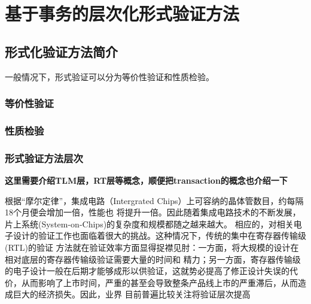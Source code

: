 
\graphicspath{{figures/}}

\chapter{基于事务的层次化形式验证方法}
\label{cha:hierarchy}


\section{形式化验证方法简介}
\label{sec:hierarchy-intro}

一般情况下，形式验证可以分为等价性验证和性质检验。

\subsection{等价性验证}
\label{sec:equal}

\subsection{性质检验}
\label{sec:property-checking}

\subsection{形式验证方法层次}
\label{sec:fv-categories}

{\bf 这里需要介绍TLM层，RT层等概念，顺便把transaction的概念也介绍一下}

根据``摩尔定律''，集成电路（Intergrated Chips）上可容纳的晶体管数目，约每隔18个月便会增加一倍，性能也
将提升一倍。因此随着集成电路技术的不断发展，片上系统(System-on-Chips)的复杂度和规模都随之越来越大。
相应的，对相关电子设计的验证工作也面临着很大的挑战。这种情况下，传统的集中在寄存器传输级(RTL)的验证
方法就在验证效率方面显得捉襟见肘：一方面，将大规模的设计在相对底层的寄存器传输级验证需要大量的时间和
精力；另一方面，寄存器传输级的电子设计一般在后期才能够成形以供验证，这就势必提高了修正设计失误的代
价，从而影响了上市时间，严重的甚至会导致整条产品线上市的严重滞后，从而造成巨大的经济损失。因此，业界
目前普遍比较关注将验证层次提高

